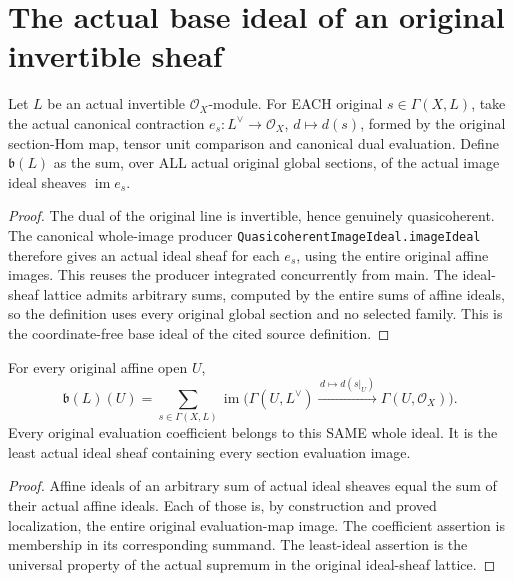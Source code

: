 \section{The actual base ideal of an original invertible sheaf}

\begin{definition}
\label{def:actual-invertible-sheaf-base-ideal}
Let $L$ be an actual invertible $\mathcal O_X$-module. For EACH original
$s\in\Gamma(X,L)$, take the actual canonical contraction
$e_s:L^\vee\to\mathcal O_X$, $d\mapsto d(s)$, formed by the original
section-Hom map, tensor unit comparison and canonical dual evaluation.
Define $\mathfrak b(L)$ as the sum, over ALL actual original global
sections, of the actual image ideal sheaves $\operatorname{im}e_s$.
\leanok
\end{definition}
\begin{proof}
The dual of the original line is invertible, hence genuinely
quasicoherent. The canonical whole-image producer
\texttt{QuasicoherentImageIdeal.imageIdeal} therefore gives an actual
ideal sheaf for each $e_s$, using the entire original affine images.
This reuses the producer integrated concurrently from main. The
ideal-sheaf lattice admits
arbitrary sums, computed by the entire sums of affine ideals, so the
definition uses every original global section and no selected family.
This is the coordinate-free base ideal of the cited source definition.
\end{proof}

\begin{proposition}
\label{prop:actual-invertible-sheaf-base-ideal-affine}
For every original affine open $U$,
\[
 \mathfrak b(L)(U)=\sum_{s\in\Gamma(X,L)}
   \operatorname{im}\bigl(\Gamma(U,L^\vee)
                   \xrightarrow{\,d\mapsto d(s|_U)\,}\Gamma(U,\mathcal O_X)\bigr).
\]
Every original evaluation coefficient belongs to this SAME whole
ideal. It is the least actual ideal sheaf containing every section
evaluation image.
\leanok
\end{proposition}
\begin{proof}
Affine ideals of an arbitrary sum of actual ideal sheaves equal the
sum of their actual affine ideals. Each of those is, by construction
and proved localization, the entire original evaluation-map image.
The coefficient assertion is membership in its corresponding summand.
The least-ideal assertion is the universal property of the actual
supremum in the original ideal-sheaf lattice.
\end{proof}

